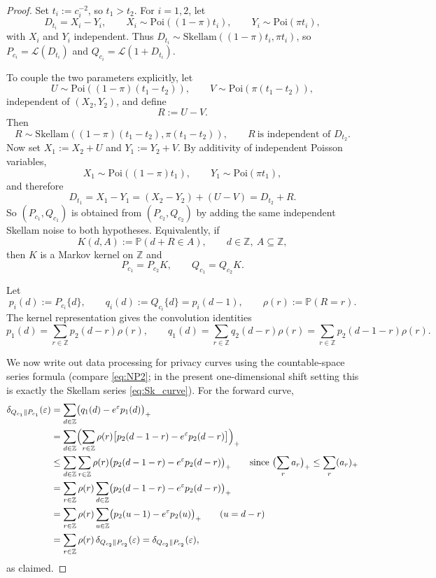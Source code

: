 \documentclass{article}
\begin{document}
\begin{proof}
Set $t_i:=c_i^{-2}$, so $t_1>t_2$. For $i=1,2$, let
\[
D_{t_i}=X_i-Y_i,
\qquad
X_i\sim \mathrm{Poi}((1-\pi)t_i),
\qquad
Y_i\sim \mathrm{Poi}(\pi t_i),
\]
with $X_i$ and $Y_i$ independent. Thus $D_{t_i}\sim \mathrm{Skellam}((1-\pi)t_i,\pi t_i)$, so
$P_{c_i}=\mathcal L(D_{t_i})$ and $Q_{c_i}=\mathcal L(1+D_{t_i})$.

To couple the two parameters explicitly, let
\[
U\sim \mathrm{Poi}((1-\pi)(t_1-t_2)),
\qquad
V\sim \mathrm{Poi}(\pi(t_1-t_2)),
\]
independent of $(X_2,Y_2)$, and define
\[
R:=U-V.
\]
Then
\[
R\sim \mathrm{Skellam}((1-\pi)(t_1-t_2),\pi(t_1-t_2)),
\qquad
R\ \text{is independent of } D_{t_2}.
\]
Now set $X_1:=X_2+U$ and $Y_1:=Y_2+V$. By additivity of independent Poisson variables,
\[
X_1\sim \mathrm{Poi}((1-\pi)t_1),
\qquad
Y_1\sim \mathrm{Poi}(\pi t_1),
\]
and therefore
\[
D_{t_1}=X_1-Y_1=(X_2-Y_2)+(U-V)=D_{t_2}+R.
\]
So $(P_{c_1},Q_{c_1})$ is obtained from $(P_{c_2},Q_{c_2})$ by adding the same independent
Skellam noise to both hypotheses. Equivalently, if
\[
K(d,A):=\mathbb P(d+R\in A),\qquad d\in\mathbb Z,\ A\subseteq \mathbb Z,
\]
then $K$ is a Markov kernel on $\mathbb Z$ and
\[
P_{c_1}=P_{c_2}K,
\qquad
Q_{c_1}=Q_{c_2}K.
\]

Let
\[
p_i(d):=P_{c_i}\{d\},
\qquad
q_i(d):=Q_{c_i}\{d\}=p_i(d-1),
\qquad
\rho(r):=\mathbb P(R=r).
\]
The kernel representation gives the convolution identities
\[
p_1(d)=\sum_{r\in\mathbb Z} p_2(d-r)\rho(r),
\qquad
q_1(d)=\sum_{r\in\mathbb Z} q_2(d-r)\rho(r)
      =\sum_{r\in\mathbb Z} p_2(d-1-r)\rho(r).
\]

We now write out data processing for privacy curves using the countable-space series formula
(compare \eqref{eq:NP2}; in the present one-dimensional shift setting this is exactly the Skellam
series \eqref{eq:Sk_curve}). For the forward curve,
\begin{align*}
\delta_{Q_{c_1}\|P_{c_1}}(\varepsilon)
&= \sum_{d\in\mathbb Z}\bigl(q_1(d)-e^{\varepsilon}p_1(d)\bigr)_+ \\
&= \sum_{d\in\mathbb Z}\Bigl(\sum_{r\in\mathbb Z}\rho(r)
   \bigl[p_2(d-1-r)-e^{\varepsilon}p_2(d-r)\bigr]\Bigr)_+ \\
&\le \sum_{d\in\mathbb Z}\sum_{r\in\mathbb Z}\rho(r)
   \bigl(p_2(d-1-r)-e^{\varepsilon}p_2(d-r)\bigr)_+
   \qquad\text{since }\bigl(\sum_r a_r\bigr)_+\le \sum_r (a_r)_+ \\
&= \sum_{r\in\mathbb Z}\rho(r)
   \sum_{d\in\mathbb Z}\bigl(p_2(d-1-r)-e^{\varepsilon}p_2(d-r)\bigr)_+ \\
&= \sum_{r\in\mathbb Z}\rho(r)
   \sum_{u\in\mathbb Z}\bigl(p_2(u-1)-e^{\varepsilon}p_2(u)\bigr)_+
   \qquad (u=d-r) \\
&= \sum_{r\in\mathbb Z}\rho(r)\,\delta_{Q_{c_2}\|P_{c_2}}(\varepsilon)
 = \delta_{Q_{c_2}\|P_{c_2}}(\varepsilon),
\end{align*}
as claimed.


\end{proof}
\end{document}
